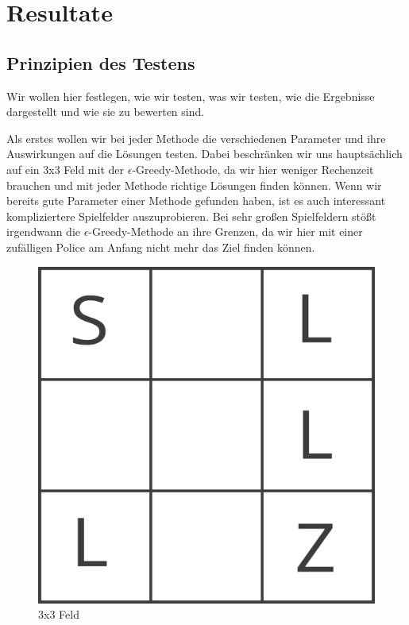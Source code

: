 \section{Resultate}
\label{sec:res}

\subsection{Prinzipien des Testens}
\label{subsec:Prinzipien}

Wir wollen hier festlegen, wie wir testen, was wir testen, wie die Ergebnisse dargestellt und wie sie zu bewerten sind.

Als erstes wollen wir bei jeder Methode die verschiedenen Parameter und ihre Auswirkungen auf die Lösungen testen. Dabei beschränken wir uns hauptsächlich auf ein 3x3 Feld mit der $\epsilon$-Greedy-Methode, da wir hier weniger Rechenzeit brauchen und mit jeder Methode richtige Lösungen finden können. Wenn wir bereits gute Parameter einer Methode gefunden haben, ist es auch interessant kompliziertere Spielfelder auszuprobieren. Bei sehr großen Spielfeldern stößt irgendwann die $\epsilon$-Greedy-Methode an ihre Grenzen, da wir hier mit einer zufälligen Police am Anfang nicht mehr das Ziel finden können. 

\begin{figure}[H]
\centering
\includegraphics[width=\textwidth]{Figures/Intermediate.png}
\caption{3x3 Feld}
\label{advanced}
\end{figure}

